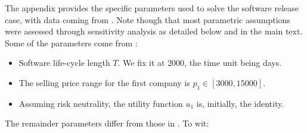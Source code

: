 \documentclass[a4paper,fleqn, 11pt]{cas-sc}
\begin{document}
The appendix provides the specific parameters used to solve the software release case,
 with data coming from \cite{Okumoto1979}. Note though that most parametric assumptions were assessed
through sensitivity analysis as detailed below and in
the main text.
Some of the parameters come from \cite{softearlier}:
\begin{itemize}
                \item Software life-cycle length $T$. We fix it at $2000$, the time unit being days.
         \item The selling price range for the first company is $p_1 \in [3000, 15000]$.
         \item Assuming risk neutrality, the utility function $u_1$ is, initially, the identity.
    \end{itemize}
The remainder parameters differ from those in \cite{softearlier}. To wit:
\end{document}
